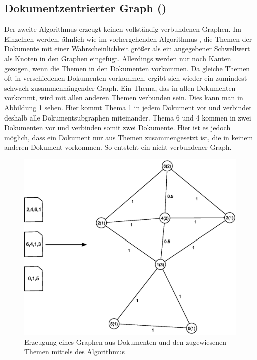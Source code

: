 \subsection{Dokumentzentrierter Graph (\CDC)}
\label{subsec:cdc}

Der zweite Algorithmus erzeugt keinen vollständig verbundenen Graphen. 
Im Einzelnen werden, ähnlich wie im vorhergehenden Algorithmus \CST, die Themen der Dokumente mit einer Wahrscheinlichkeit größer als ein angegebener Schwellwert als Knoten in den Graphen eingefügt. Allerdings werden nur noch Kanten gezogen, wenn die Themen in den Dokumenten vorkommen. Da gleiche Themen oft in verschiedenen Dokumenten vorkommen, ergibt sich wieder ein zumindest schwach zusammenhängender Graph. Ein Thema, das in allen Dokumenten vorkommt, wird mit allen anderen Themen verbunden sein. Dies kann man in Abbildung \ref{fig:documentCentricFrameToGraph} sehen. Hier kommt Thema 1 in jedem Dokument vor und verbindet deshalb alle Dokumentsubgraphen miteinander. Thema 6 und 4 kommen in zwei Dokumenten vor und verbinden somit zwei Dokumente. Hier ist es jedoch möglich, dass ein Dokument nur aus Themen zusammengesetzt ist, die in keinem anderen Dokument vorkommen. So entsteht ein nicht verbundener Graph. 

\begin{figure}[ht]
\centering
\includegraphics[scale=.6]{images/content/05_workflowTime/documentCentricFrameToGraph.eps} 
\caption{Erzeugung eines Graphen aus Dokumenten und den zugewiesenen Themen mittels des Algorithmus \CDC}
\label{fig:documentCentricFrameToGraph}
\end{figure}

